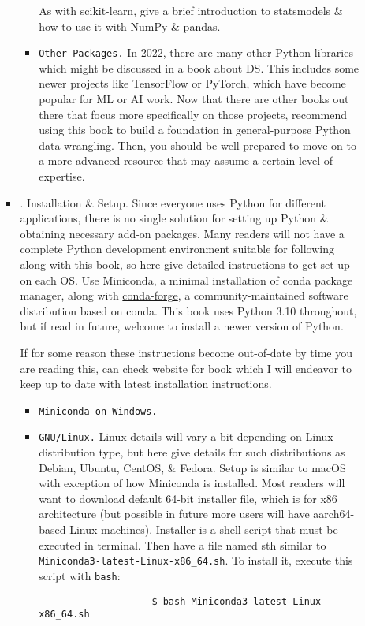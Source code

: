 \documentclass{article}
\begin{document}
\begin{enumerate}
\begin{itemize}
\begin{itemize}
\begin{itemize}
				As with scikit-learn, give a brief introduction to statsmodels \& how to use it with NumPy \& pandas.
				\item {\tt Other Packages.} In 2022, there are many other Python libraries which might be discussed in a book about DS. This includes some newer projects like TensorFlow or PyTorch, which have become popular for ML or AI work. Now that there are other books out there that focus more specifically on those projects, recommend using this book to build a foundation in general-purpose Python data wrangling. Then, you should be well prepared to move on to a more advanced resource that may assume a certain level of expertise.
			\end{itemize}
			\item {. Installation \& Setup.} Since everyone uses Python for different applications, there is no single solution for setting up Python \& obtaining necessary add-on packages. Many readers will not have a complete Python development environment suitable for following along with this book, so here give detailed instructions to get set up on each OS. Use Miniconda, a minimal installation of conda package manager, along with \href{https://conda-forge.org}{conda-forge}, a community-maintained software distribution based on conda. This book uses Python 3.10 throughout, but if read in future, welcome to install a newer version of Python.
			
			If for some reason these instructions become out-of-date by time you are reading this, can check \href{https://wesmckinney.com/book}{website for book} which I will endeavor to keep up to date with latest installation instructions.
			\begin{itemize}
				\item {\tt Miniconda on Windows.}
				\item {\tt GNU{\tt/}Linux.} Linux details will vary a bit depending on Linux distribution type, but here give details for such distributions as Debian, Ubuntu, CentOS, \& Fedora. Setup is similar to macOS with exception of how Miniconda is installed. Most readers will want to download default 64-bit installer file, which is for x86 architecture (but possible in future more users will have aarch64-based Linux machines). Installer is a shell script that must be executed in terminal. Then have a file named sth similar to \verb|Miniconda3-latest-Linux-x86_64.sh|. To install it, execute this script with {\tt bash}:
				\begin{verbatim}
					$ bash Miniconda3-latest-Linux-x86_64.sh
				\end{verbatim}
				

\end{itemize}
\end{itemize}
\end{itemize}
\end{enumerate}
\end{document}
